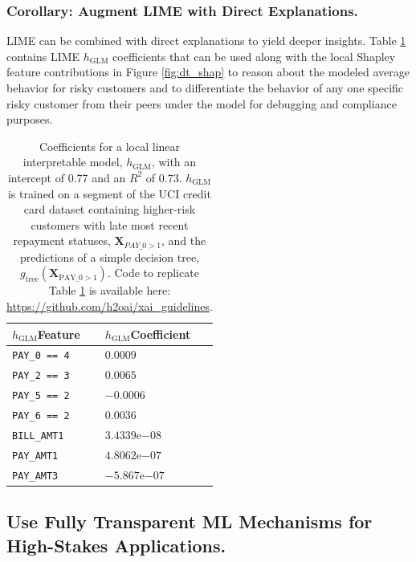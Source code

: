 \documentclass[sigconf]{acmart}
\begin{document}
\subsubsection{Corollary: Augment LIME with Direct Explanations.} LIME can be combined with direct explanations to yield deeper insights.  Table \ref{tab:lime} contains LIME $h_{\text{GLM}}$ coefficients that can be used along with the local Shapley feature contributions in Figure \ref{fig:dt_shap} to reason about the modeled average behavior for risky customers and to differentiate the behavior of any one specific risky customer from their peers under the model for debugging and compliance purposes.

\begin{table}[htb!]
	\caption{Coefficients for a local linear interpretable model, $h_{\text{GLM}}$, with an intercept of 0.77 and an $R^2$ of 0.73. $h_{\text{GLM}}$ is trained on a segment of the UCI credit card dataset containing higher-risk customers with late most recent repayment statuses, $\mathbf{X}_{PAY \_ 0 > 1}$, and the predictions of a simple decision tree, $g_{\text{tree}}(\mathbf{X}_{\text{PAY\_0} > 1})$. Code to replicate Table \ref{tab:lime} is available here: \url{https://github.com/h2oai/xai_guidelines}.} 
		\centering
			\footnotesize
				\begin{tabular}{ | p{2cm} | p{1.7cm} | }
				\hline
				$h_{\text{GLM}}$\newline Feature & $h_{\text{GLM}}$\newline Coefficient \\ 
				\hline
				\texttt{PAY\_0 == 4} & $0.0009$ \\
				\hline
				\texttt{PAY\_2 == 3} & $0.0065$ \\
				\hline
				\texttt{PAY\_5 == 2} & $-0.0006$ \\
				\hline
				\texttt{PAY\_6 == 2} & $0.0036$ \\
				\hline				
				\texttt{BILL\_AMT1} & $3.4339\mathrm{e}{-08}$ \\
				\hline
				\texttt{PAY\_AMT1} & $4.8062\mathrm{e}{-07}$ \\
				\hline	
				\texttt{PAY\_AMT3} & $-5.867\mathrm{e}{-07}$ \\	
				\hline	
			\end{tabular}	
  		\label{tab:lime}
\end{table}	

\subsection{Use Fully Transparent ML Mechanisms for High-Stakes Applications.} \label{sec:white_box}
\end{document}
